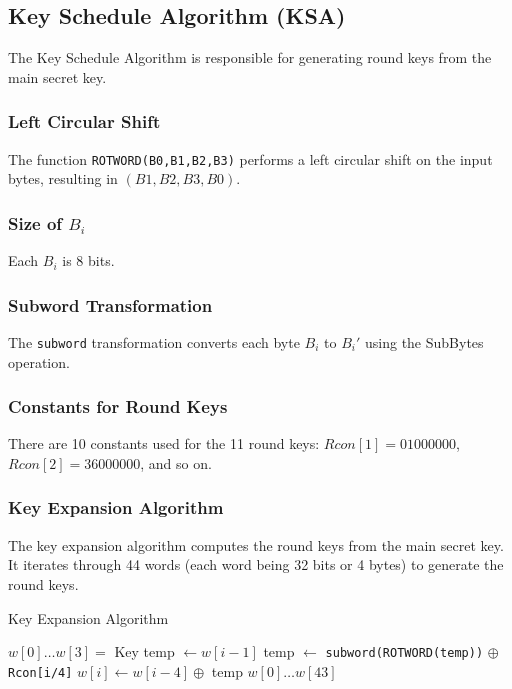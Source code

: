 \documentclass[11pt]{article}
\begin{document}
\subsection*{Key Schedule Algorithm (KSA)}
The Key Schedule Algorithm is responsible for generating round keys from the main secret key.

\subsubsection*{Left Circular Shift}
The function \texttt{ROTWORD(B0,B1,B2,B3)} performs a left circular shift on the input bytes, resulting in \((B1,B2,B3,B0)\).

\subsubsection*{Size of \(B_i\)}
Each \(B_i\) is 8 bits.

\subsubsection*{Subword Transformation}
The \texttt{subword} transformation converts each byte \(B_i\) to \(B_i'\) using the SubBytes operation.

\subsubsection*{Constants for Round Keys}
There are 10 constants used for the 11 round keys: \(Rcon[1] = 01000000\), \(Rcon[2] = 36000000\), and so on.

\subsubsection*{Key Expansion Algorithm}
The key expansion algorithm computes the round keys from the main secret key. It iterates through 44 words (each word being 32 bits or 4 bytes) to generate the round keys.
\begin{algorithm}
\caption{Key Expansion Algorithm}
\begin{algorithmic}[1]
\State $w[0] \ldots w[3] =$ Key
    \State temp $\gets w[i-1]$
        \State temp $\gets$ \texttt{subword(ROTWORD(temp))} $\oplus$ \texttt{Rcon[i/4]}
    \EndIf
    \State $w[i] \gets w[i-4] \oplus$ temp
\EndFor
\State \Return $w[0] \ldots w[43]$
\end{algorithmic}
\end{algorithm}
\end{document}
